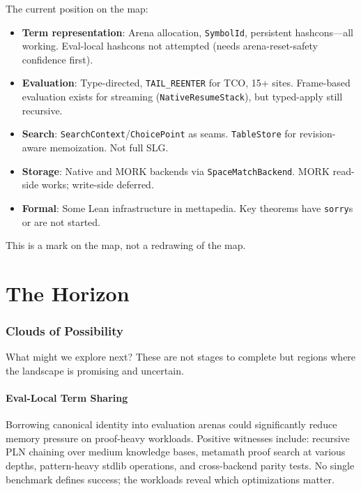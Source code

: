 \documentclass[11pt]{article}
\newcommand{\code}[1]{\texttt{#1}}
\newcommand{\MORK}{\textup{MORK}}
\begin{document}
The current position on the map:

\begin{itemize}
\item \textbf{Term representation}: Arena allocation, \code{SymbolId},
  persistent hashcons---all working.  Eval-local hashcons not attempted
  (needs arena-reset-safety confidence first).
\item \textbf{Evaluation}: Type-directed, \code{TAIL\_REENTER} for TCO,
  15+ sites.  Frame-based evaluation exists for streaming
  (\code{NativeResumeStack}), but typed-apply still recursive.
\item \textbf{Search}: \code{SearchContext}/\code{ChoicePoint} as seams.
  \code{TableStore} for revision-aware memoization.  Not full SLG.
\item \textbf{Storage}: Native and \MORK{} backends via
  \code{SpaceMatchBackend}.  \MORK{} read-side works; write-side deferred.
\item \textbf{Formal}: Some Lean infrastructure in mettapedia.  Key
  theorems have \code{sorry}s or are not started.
\end{itemize}

This is a mark on the map, not a redrawing of the map.

\part{The Horizon}

\section{Clouds of Possibility}
\label{sec:clouds}

What might we explore next?  These are not stages to complete but
regions where the landscape is promising and uncertain.

\subsection{Eval-Local Term Sharing}

Borrowing canonical identity into evaluation arenas could significantly
reduce memory pressure on proof-heavy workloads.  Positive witnesses include:
recursive PLN chaining over medium knowledge bases, metamath proof search
at various depths, pattern-heavy stdlib operations, and cross-backend parity
tests.  No single benchmark defines success; the workloads reveal which
optimizations matter.
\end{document}
